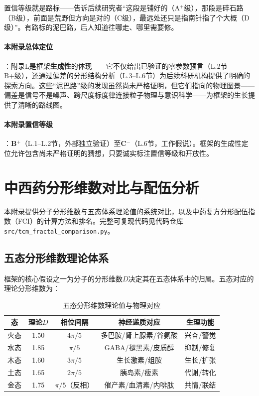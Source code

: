 \documentclass[12pt,a4paper,twocolumn]{article}
\begin{document}
置信等级就是路标——告诉后续研究者``这段是铺好的（A$^+$级），那段是碎石路（B级），前面是荒野但方向是对的（C级），最远处还只是指南针指了个大概（D级）''。有路标的泥巴路，后人知道往哪走、哪里需要修。

\paragraph{本附录总体定位}：附录L是框架\textbf{生成性}的体现——它不仅给出已验证的零参数预言（L.2节B+级），还通过偏差的分形结构分析（L.3--L.6节）为后续科研机构提供了明确的探索方向。这些``泥巴路''级的发现虽然尚未严格证明，但它们指向的物理图景——偏差是信号不是噪声、跨尺度标度律连接粒子物理与意识科学——为框架的生长提供了清晰的路线图。

\paragraph{本附录置信等级}：\textbf{B$^+$}（L.1--L.2节，外部独立验证）至\textbf{C$^-$}（L.6节，工作假说）。框架的生成性定位允许包含尚未严格证明的猜想，只要诚实标注置信等级和开放性。


\section{中西药分形维数对比与配伍分析}
\label{app:tcm_comparison}

本附录提供分子分形维数与五态体系理论值的系统对比，以及中药复方分形配伍指数（FCI）的计算方法和排名。完整可复现代码见代码仓库\texttt{src/tcm\_fractal\_comparison.py}。

\subsection{五态分形维数理论体系}
\label{subsec:five_states_theory}

框架的核心假设之一为分子的分形维数$D$决定其在五态体系中的归属。五态对应的理论分形维数为：
\begin{table}[H]
\centering
\caption{五态分形维数理论值与物理对应}
\begin{tabular}{c|c|c|c|c}
\hline
\textbf{态} & \textbf{理论$D$} & \textbf{相位间隔} & \textbf{神经递质对应} & \textbf{生理功能} \\
\hline
火态 & 1.50 & $4\pi/5$ & 多巴胺/肾上腺素/谷氨酸 & 兴奋/警觉 \\
水态 & 1.85 & $\pi/5$ & GABA/褪黑素/皮质醇 & 抑制/修复 \\
木态 & 1.60 & $3\pi/5$ & 生长激素/组胺 & 生长/扩张 \\
土态 & 1.65 & $2\pi/5$ & 胰岛素/瘦素 & 代谢/转化 \\
金态 & 1.75 & $\pi/5$（反相） & 催产素/血清素/内啡肽 & 共情/联结 \\
\hline
\end{tabular}
\end{table}
\end{document}
